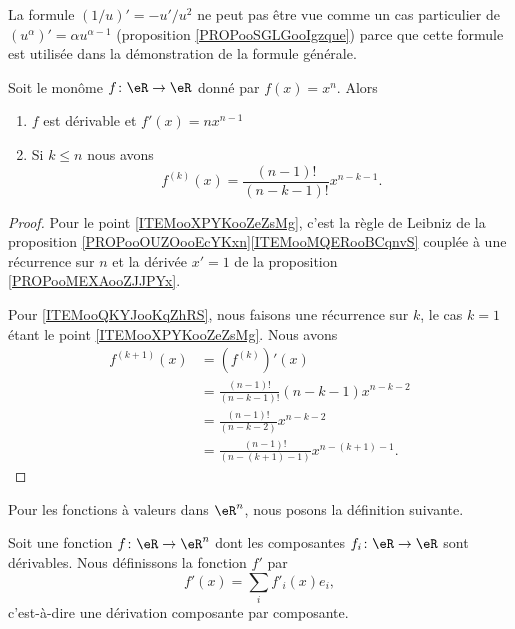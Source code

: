 \begin{remark}
	La formule \( (1/u)'=-u'/u^2\) ne peut pas être vue comme un cas particulier de \( (u^{\alpha})'=\alpha u^{\alpha-1}\) (proposition \ref{PROPooSGLGooIgzque}) parce que cette formule est utilisée dans la démonstration de la formule générale.
\end{remark}

\begin{lemma}	\label{LEMooZQIAooVbgFKo}
	Soit le monôme \(f \colon \eR\to \eR  \) donné par \( f(x)=x^n\). Alors
	\begin{enumerate}
		\item		\label{ITEMooXPYKooZeZsMg}
		      \( f\) est dérivable et \( f'(x)=n x^{n-1}\)
		\item		\label{ITEMooQKYJooKqZhRS}
		      Si \( k\leq n\) nous avons
		      \begin{equation}
			      f^{(k)}(x)=\frac{ (n-1)! }{ (n-k-1)! }x^{n-k-1}.
		      \end{equation}
	\end{enumerate}
\end{lemma}

\begin{proof}
	Pour le point \ref{ITEMooXPYKooZeZsMg}, c'est la règle de Leibniz de la proposition \ref{PROPooOUZOooEcYKxn}\ref{ITEMooMQERooBCqnvS} couplée à une récurrence sur \( n\) et la dérivée \( x'=1\) de la proposition \ref{PROPooMEXAooZJJPYx}.

	Pour \ref{ITEMooQKYJooKqZhRS}, nous faisons une récurrence sur \( k\), le cas \( k=1\) étant le point \ref{ITEMooXPYKooZeZsMg}. Nous avons
	\begin{subequations}
		\begin{align}
			f^{(k+1)}(x) & =(f^{(k)})'(x)                                \\
			             & =\frac{ (n-1)! }{ (n-k-1)! }(n-k-1)x^{n-k-2}  \\
			             & =\frac{ (n-1)! }{ (n-k-2) }x^{n-k-2}          \\
			             & =\frac{ (n-1)! }{ (n-(k+1)-1) }x^{n-(k+1)-1}.
		\end{align}
	\end{subequations}
\end{proof}


Pour les fonctions à valeurs dans \( \eR^n\), nous posons la définition suivante.
\begin{definition}      \label{DEFooNEPUooWOMpyu}
	Soit une fonction \( f\colon \eR\to \eR^n\) dont les composantes \( f_i\colon \eR\to \eR\) sont dérivables. Nous définissons la fonction \( f'\) par
	\begin{equation}
		f'(x)=\sum_if'_i(x)e_i,
	\end{equation}
	c'est-à-dire une dérivation composante par composante.
\end{definition}

